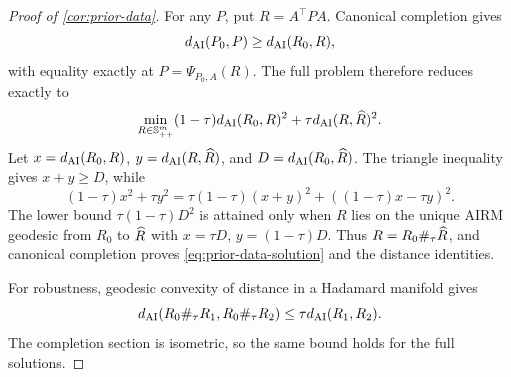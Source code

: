 \begin{proof}[Proof of \cref{cor:prior-data}]
For any \(P\), put \(R=A^\top PA\).  Canonical completion gives
\[
  d_{\mathrm{AI}}(P_0,P)\ge d_{\mathrm{AI}}(R_0,R),
\]
with equality exactly at \(P=\Psi_{P_0,A}(R)\).  The full problem therefore
reduces exactly to
\[
  \min_{R\in\mathbb S_{++}^m}
  (1-\tau)d_{\mathrm{AI}}(R_0,R)^2+\tau d_{\mathrm{AI}}(R,\widehat R)^2.
\]
Let \(x=d_{\mathrm{AI}}(R_0,R)\), \(y=d_{\mathrm{AI}}(R,\widehat R)\), and
\(D=d_{\mathrm{AI}}(R_0,\widehat R)\).  The triangle inequality gives \(x+y\ge D\), while
\[
  (1-\tau)x^2+\tau y^2
  =\tau(1-\tau)(x+y)^2+((1-\tau)x-\tau y)^2.
\]
The lower bound \(\tau(1-\tau)D^2\) is attained only when \(R\) lies on the
unique AIRM geodesic from \(R_0\) to \(\widehat R\) with
\(x=\tau D\), \(y=(1-\tau)D\).  Thus
\(R=R_0\#_\tau\widehat R\), and canonical completion proves
\eqref{eq:prior-data-solution} and the distance identities.

For robustness, geodesic convexity of distance in a Hadamard manifold gives
\[
  d_{\mathrm{AI}}(R_0\#_\tau R_1,R_0\#_\tau R_2)
  \le\tau d_{\mathrm{AI}}(R_1,R_2).
\]
The completion section is isometric, so the same bound holds for the full
solutions.
\end{proof}
